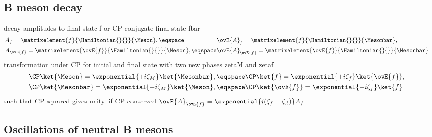 \subsection{B meson decay}
\label{sec:cpv_theory:flavour_physics:bdecays}

decay amplitudes to final state f or CP conjugate final state fbar
%
\begin{equation}
  \begin{alignedat}{2}
    & A_f         = \matrixelement{f}{\Hamiltonian{}{}}{\Meson},        \eqspace && \ovE{A}_f         = \matrixelement{f}{\Hamiltonian{}{}}{\Mesonbar}, \\
    & A_{\ovE{f}} = \matrixelement{\ovE{f}}{\Hamiltonian{}{}}{\Meson},  \eqspace && \ovE{A}_{\ovE{f}} = \matrixelement{\ovE{f}}{\Hamiltonian{}{}}{\Mesonbar}
  \end{alignedat}
\end{equation}
%
transformation under CP for initial and final state with two new phases zetaM and zetaf
%
\begin{equation}
  \begin{alignedat}{2}
    & \CP\ket{\Meson}    = \exponential{+i\zeta_{M}} \ket{\Mesonbar},\eqspace && \CP \ket{f}        = \exponential{+i\zeta_{f}} \ket{\ovE{f}}, \\
    & \CP\ket{\Mesonbar} = \exponential{-i\zeta_{M}} \ket{\Meson}   ,\eqspace && \CP \ket{\ovE{f}}  = \exponential{-i\zeta_{f}} \ket{f}
  \end{alignedat}
\end{equation}
%
such that CP squared gives unity. if CP conserved $\ovE{A}_{\ovE{f}} = \exponential{i(\zeta_f - \zeta_A)} A_f$

\subsection{Oscillations of neutral B mesons}
\label{sec:cpv_theory:flavour_physics:bmixing}

